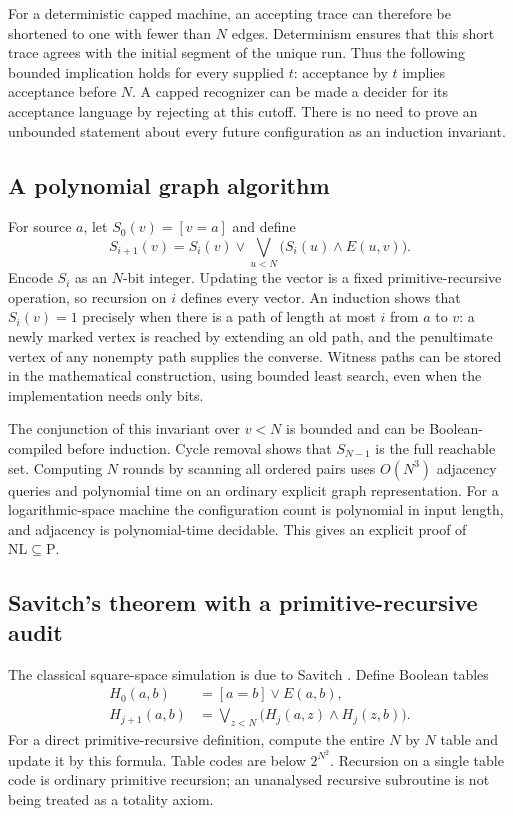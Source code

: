 For a deterministic capped machine, an accepting trace can therefore be
shortened to one with fewer than $N$ edges. Determinism ensures that this
short trace agrees with the initial segment of the unique run. Thus the
following bounded implication holds for every supplied $t$: acceptance by
$t$ implies acceptance before $N$. A capped recognizer can be made a decider
for its acceptance language by rejecting at this cutoff. There is no need to
prove an unbounded statement about every future configuration as an
induction invariant.

\subsection{A polynomial graph algorithm}

For source $a$, let $S_0(v)=[v=a]$ and define
\[
 S_{i+1}(v)=S_i(v)\mathbin\lor
       \bigvee_{u<N}\bigl(S_i(u)\mathbin\land E(u,v)\bigr).
\]
Encode $S_i$ as an $N$-bit integer. Updating the vector is a fixed
primitive-recursive operation, so recursion on $i$ defines every vector.
An induction shows that $S_i(v)=1$ precisely when there is a path of length
at most $i$ from $a$ to $v$: a newly marked vertex is reached by extending
an old path, and the penultimate vertex of any nonempty path supplies the
converse. Witness paths can be stored in the mathematical construction,
using bounded least search, even when the implementation needs only bits.

The conjunction of this invariant over $v<N$ is bounded and can be
Boolean-compiled before induction. Cycle removal shows that $S_{N-1}$ is
the full reachable set. Computing $N$ rounds by scanning all ordered pairs
uses $O(N^3)$ adjacency queries and polynomial time on an ordinary explicit
graph representation. For a logarithmic-space machine the configuration
count is polynomial in input length, and adjacency is polynomial-time
decidable. This gives an explicit proof of $\mathrm{NL}\subseteq\mathrm{P}$.

\subsection{Savitch's theorem with a primitive-recursive audit}

The classical square-space simulation is due to Savitch
\cite{Savitch1970}. Define Boolean tables
\begin{align*}
 H_0(a,b)&=[a=b]\lor E(a,b),\\
 H_{j+1}(a,b)&=\bigvee_{z<N}
               \bigl(H_j(a,z)\land H_j(z,b)\bigr).
\end{align*}
For a direct primitive-recursive definition, compute the entire $N$ by $N$
table and update it by this formula. Table codes are below $2^{N^2}$.
Recursion on a single table code is ordinary primitive recursion; an
unanalysed recursive subroutine is not being treated as a totality axiom.

